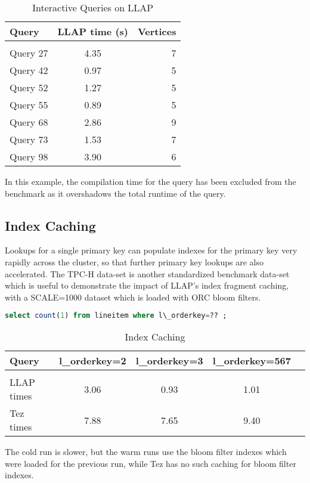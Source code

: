 \begin{table}[h]
\begin{tabular}{l|*{1}cr}
Query & LLAP time (s) & Vertices \\
\hline \\
Query 27 & 4.35 & 7  \\
Query 42 & 0.97 & 5  \\
Query 52 & 1.27 & 5  \\
Query 55 & 0.89 & 5 \\
Query 68 & 2.86 & 9 \\
Query 73 & 1.53 & 7 \\
Query 98 & 3.90 & 6 \\
\end{tabular}
\caption{Interactive Queries on LLAP}
\end{table}

In this example, the compilation time for the query has been excluded from the benchmark as it overshadows the
total runtime of the query.

\subsection{Index Caching}

Lookups for a single primary key can populate indexes for the primary key very rapidly 
across the cluster, so that further primary key lookups are also accelerated. 
The TPC-H data-set is another standardized benchmark data-set which is useful to demonstrate the impact of 
LLAP's index fragment caching, with a SCALE=1000 dataset which is loaded with ORC bloom filters.

\begin{lstlisting}[language=sql]
select count(1) from lineitem where l\_orderkey=?? ;
\end{lstlisting}

\begin{table}[h]
\begin{tabular}{l|*{3}cr}
Query & l\_orderkey=2 & l\_orderkey=3 & l\_orderkey=567\\
\hline \\
LLAP times & 3.06 & 0.93 & 1.01 \\
Tez times & 7.88 & 7.65 & 9.40  \\
\end{tabular}
\caption{Index Caching}
\end{table}

The cold run is slower, but the warm runs use the bloom filter indexes which were loaded for the previous run, while Tez has no such 
caching for bloom filter indexes.




